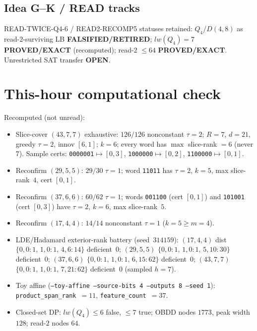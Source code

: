 \documentclass[11pt]{article}
\begin{document}
\subsection*{Idea G--K / READ tracks}
READ-TWICE-Q4-6 / READ2-RECOMP5 statuses retained: $Q_4$/$D(4,8)$ as read-$2$-surviving LB
\textbf{FALSIFIED/RETIRED}; $lw(Q_4)=7$ \textbf{PROVED/EXACT} (recomputed); read-$2$ $\le64$
\textbf{PROVED/EXACT}. Unrestricted SAT transfer \textbf{OPEN}.

\section*{This-hour computational check}
Recomputed (not unread):
\begin{itemize}
\item Slice-cover $(43,7,7)$ exhaustive: $126/126$ nonconstant $\tau{=}2$;
  $R{=}7$, $d{=}21$, greedy $\tau{=}2$, innov $[6,1]$; $k{=}6$;
  every word has $\max$ slice-rank $=6$ (never $7$).
  Sample certs: \texttt{0000001}$\mapsto[0,3]$, \texttt{1000000}$\mapsto[0,2]$,
  \texttt{1100000}$\mapsto[0,1]$.
\item Reconfirm $(29,5,5)$: $29/30$ $\tau{=}1$; word \texttt{11011} has $\tau{=}2$,
  $k{=}5$, max slice-rank~$4$, cert $[0,1]$.
\item Reconfirm $(37,6,6)$: $60/62$ $\tau{=}1$; words \texttt{001100} (cert $[0,1]$)
  and \texttt{101001} (cert $[0,3]$) have $\tau{=}2$, $k{=}6$, max slice-rank~$5$.
\item Reconfirm $(17,4,4)$: $14/14$ nonconstant $\tau{=}1$ ($k{=}5\ge m{=}4$).
\item LDE/Hadamard exterior-rank battery (seed~$314159$):
  $(17,4,4)$ dist $\{0,0{:}1,\,1,0{:}1,\,4,6{:}14\}$ deficient~$0$;
  $(29,5,5)$ $\{0,0{:}1,\,1,0{:}1,\,5,10{:}30\}$ deficient~$0$;
  $(37,6,6)$ $\{0,0{:}1,\,1,0{:}1,\,6,15{:}62\}$ deficient~$0$;
  $(43,7,7)$ $\{0,0{:}1,\,1,0{:}1,\,7,21{:}62\}$ deficient~$0$ (sampled $h{=}7$).
\item Toy affine (\texttt{--toy-affine --source-bits 4 --outputs 8 --seed 1}):
  \texttt{product\_span\_rank}~$=11$, \texttt{feature\_count}~$=37$.
\item Closed-set DP: $lw(Q_4)\le6$ false, $\le7$ true; OBDD nodes $1773$, peak width $128$;
  read-$2$ nodes $64$.
\end{itemize}
\end{document}
